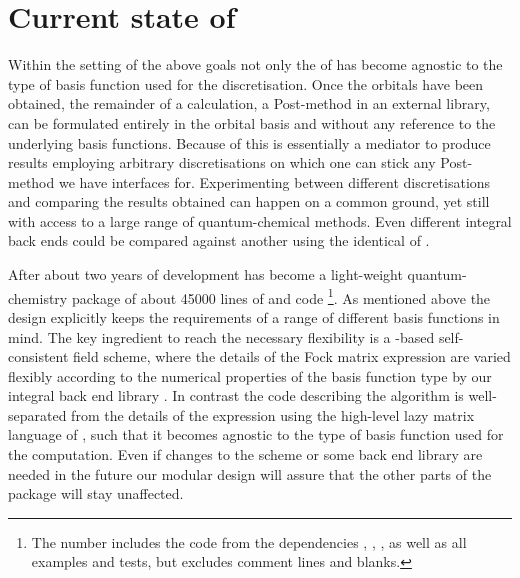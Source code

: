 \section{Current state of \molsturm}
\label{sec:MolsturmState}

Within the setting of the above goals not only the \SCF of \molsturm
has become agnostic to the type of basis function used for the discretisation.
Once the \SCF orbitals have been obtained,
the remainder of a calculation, \eg a Post-\HF method in an external library,
can be formulated entirely in the \SCF orbital basis
and without any reference to the underlying basis functions.
Because of this \molsturm is essentially a mediator
to produce \SCF results employing arbitrary discretisations
on which one can stick any Post-\HF method we have interfaces for.
Experimenting between different discretisations
and comparing the results obtained can happen on a common ground,
yet still with access to a large range of quantum-chemical methods.
Even different integral back ends
could be compared against another using the identical \SCF of \molsturm.



After about two years of development
\molsturm has become a light-weight quantum-chemistry package of about 45000
lines of \cpp and \python code%
\footnote{The number includes the code from the dependencies
\gint, \gscf, \lazyten, \krims as well as
all examples and tests, but excludes comment lines and blanks.}.
As mentioned above the design explicitly keeps the requirements of a range of
different basis functions in mind.
The key ingredient to reach the necessary flexibility
is a \contraction-based self-consistent field scheme,
where the details of the Fock matrix \contraction expression
are varied flexibly according to the numerical properties of the basis function type
by our integral back end library \gint.
In contrast
the code describing the \SCF algorithm
is well-separated from the details of the \contraction expression
using the high-level lazy matrix language of \lazyten,
such that it becomes agnostic to the type of basis function used for the computation.
Even if changes to the \SCF scheme or some back end
library are needed in the future our modular design
will assure that the other parts of the \molsturm package will stay unaffected.

